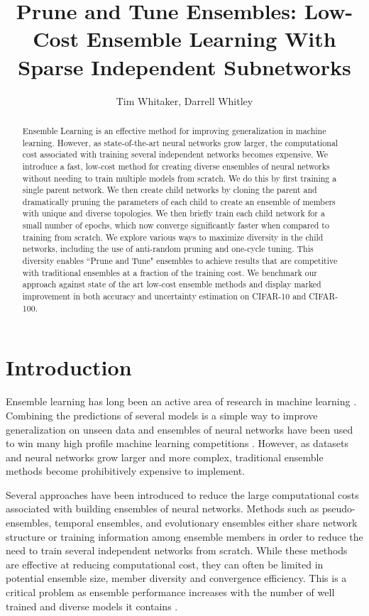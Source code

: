 \documentclass[letterpaper]{article} %
\title{Prune and Tune Ensembles: Low-Cost Ensemble Learning With Sparse Independent Subnetworks}
\author {
    Tim Whitaker,
    Darrell Whitley
}
\begin{document}
\maketitle

\begin{abstract}
Ensemble Learning is an effective method for improving generalization in machine learning. However, as state-of-the-art neural networks grow larger, the computational cost associated with training several independent networks becomes expensive. We introduce a fast, low-cost method for creating diverse ensembles of neural networks without needing to train multiple models from scratch. We do this by first training a single parent network. We then create child networks by cloning the parent and dramatically pruning the parameters of each child to create an ensemble of members with unique and diverse topologies. We then briefly train each child network for a small number of epochs, which now converge significantly faster when compared to training from scratch. We explore various ways to maximize diversity in the child networks, including the use of anti-random pruning and one-cycle tuning. This diversity enables ``Prune and Tune" ensembles to achieve results that are competitive with traditional ensembles at a fraction of the training cost. We benchmark our approach against state of the art low-cost ensemble methods and display marked improvement in both accuracy and uncertainty estimation on CIFAR-10 and CIFAR-100.
\end{abstract}

\section{Introduction}

Ensemble learning has long been an active area of research in machine learning \cite{hansen1990neural, krogh1994neural}. Combining the predictions of several models is a simple way to improve generalization on unseen data and ensembles of neural networks have been used to win many high profile machine learning competitions \cite{wolfinger2017stacked}. However, as datasets and neural networks grow larger and more complex, traditional ensemble methods become prohibitively expensive to implement.

Several approaches have been introduced to reduce the large computational costs associated with building ensembles of neural networks. Methods such as pseudo-ensembles, temporal ensembles, and evolutionary ensembles either share network structure or training information among ensemble members in order to reduce the need to train several independent networks from scratch. While these methods are effective at reducing computational cost, they can often be limited in potential ensemble size, member diversity and convergence efficiency. This is a critical problem as ensemble performance increases with the number of well trained and diverse models it contains \cite{bonab2016theoretical, oshiro2012forest}.
\end{document}
